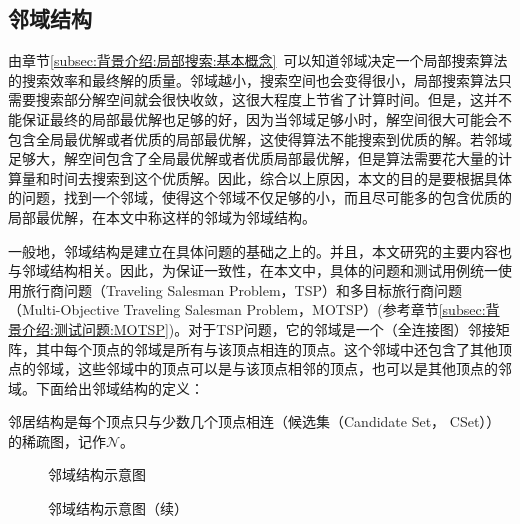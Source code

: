 \subsection{邻域结构}
\label{subsec:背景介绍:局部搜索:邻域结构}
由章节\ref{subsec:背景介绍:局部搜索:基本概念}~可以知道邻域决定一个局部搜索算法的搜索效率和最终解的质量。邻域越小，搜索空间也会变得很小，局部搜索算法只需要搜索部分解空间就会很快收敛，这很大程度上节省了计算时间。但是，这并不能保证最终的局部最优解也足够的好，因为当邻域足够小时，解空间很大可能会不包含全局最优解或者优质的局部最优解，这使得算法不能搜索到优质的解。若邻域足够大，解空间包含了全局最优解或者优质局部最优解，但是算法需要花大量的计算量和时间去搜索到这个优质解。因此，综合以上原因，本文的目的是要根据具体的问题，找到一个邻域，使得这个邻域不仅足够的小，而且尽可能多的包含优质的局部最优解，在本文中称这样的邻域为邻域结构。
\par
一般地，邻域结构是建立在具体问题的基础之上的。并且，本文研究的主要内容也与邻域结构相关。因此，为保证一致性，在本文中，具体的问题和测试用例统一使用旅行商问题（Traveling Salesman Problem，TSP）和多目标旅行商问题（Multi-Objective Traveling Salesman Problem，MOTSP）(参考章节\ref{subsec:背景介绍:测试问题:MOTSP})。对于TSP问题，它的邻域是一个（全连接图）邻接矩阵，其中每个顶点的邻域是所有与该顶点相连的顶点。这个邻域中还包含了其他顶点的邻域，这些邻域中的顶点可以是与该顶点相邻的顶点，也可以是其他顶点的邻域。下面给出邻域结构的定义：
\begin{definition}
    \label{def:邻域结构}
    邻居结构是每个顶点只与少数几个顶点相连（候选集（Candidate Set， CSet））的稀疏图，记作$\mathcal{N}$。
\end{definition}
\begin{figure}[htb]
    \caption[邻域结构示意图]{邻域结构示意图}
    \label{fig:邻域结构示意图}
\end{figure}
\begin{figure}[htb]
    \ContinuedFloat
    \caption[]{邻域结构示意图（续）}
\end{figure}
